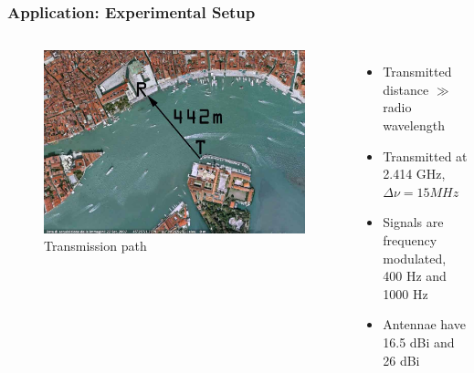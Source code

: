 \documentclass[xcolor=dvipsnames]{beamer}
\newenvironment{items}[1][]
{\begin{itemize}
    \ifthenelse{\isempty{#1}}
    {\setlength{\itemsep}{12pt}}{\setlength{\itemsep}{#1}}}
  {\end{itemize}}
\begin{document}
\begin{frame}
	\frametitle{Application: Experimental Setup}
  \begin{columns}[c]
		\begin{figure}
      \includegraphics[width=\textwidth]{birdeyeview}
      \caption{Transmission path}
      \label{pic:birdeye}
		\end{figure}
		\begin{items}
		\item Transmitted distance $\gg$ radio wavelength
		\item Transmitted at 2.414 GHz, $\Delta \nu = 15MHz$
		\item Signals are frequency modulated, 400 Hz and 1000 Hz
		\item Antennae have 16.5 dBi and 26 dBi
		\end{items}
  \end{columns}
\end{frame}
\end{document}
